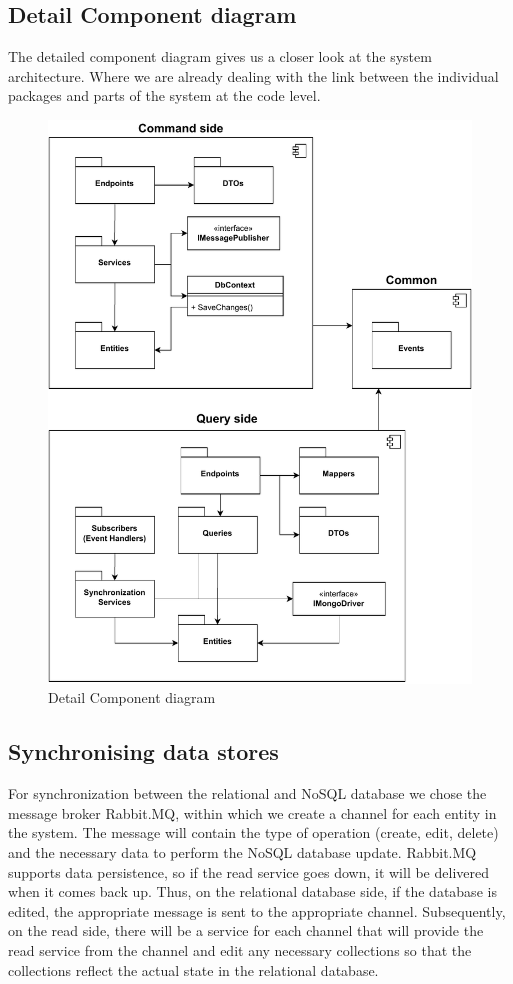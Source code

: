 \documentclass[12pt,english]{article}
\begin{document}
\subsection{Detail Component diagram}
The detailed component diagram gives us a closer look at the system architecture. Where we are already dealing with the link between the individual packages and parts of the system at the code level.
\begin{figure}[hp]
    \centering
    \includegraphics[scale=0.8]{images/pdb-system-diagram.pdf}
    \caption{Detail Component diagram}
    \label{fig:my_label}
\end{figure}

\subsection{Synchronising data stores}
For synchronization between the relational and NoSQL database we chose the message broker Rabbit.MQ, within which we create a channel for each entity in the system. The message will contain the type of operation (create, edit, delete) and the necessary data to perform the NoSQL database update. Rabbit.MQ supports data persistence, so if the read service goes down, it will be delivered when it comes back up. Thus, on the relational database side, if the database is edited, the appropriate message is sent to the appropriate channel. Subsequently, on the read side, there will be a service for each channel that will provide the read service from the channel and edit any necessary collections so that the collections reflect the actual state in the relational database.
\end{document}
